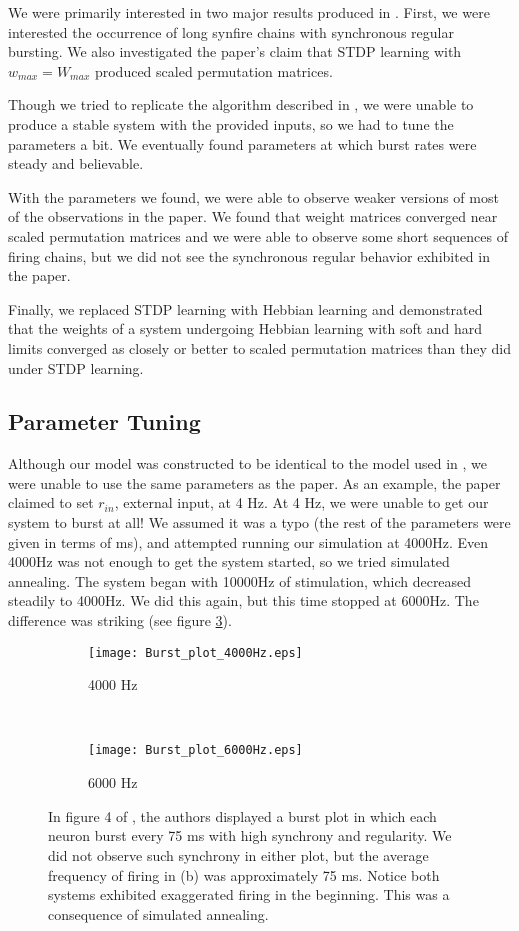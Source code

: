 We were primarily interested in two major results produced in \cite{Fiete}. First, we were interested the occurrence of long synfire chains with synchronous regular bursting. We also investigated the paper's claim that STDP learning with \(w_{max} = W_{max}\) produced scaled permutation matrices.

Though we tried to replicate the algorithm described in \cite{Fiete}, we were unable to produce a stable system with the provided inputs, so we had to tune the parameters a bit. We eventually found parameters at which burst rates were steady and believable. 

With the parameters we found, we were able to observe weaker versions of most of the observations in the paper. We found that weight matrices converged near scaled permutation matrices and we were able to observe some short sequences of firing chains, but we did not see the synchronous regular behavior exhibited in the paper.

Finally, we replaced STDP learning with Hebbian learning and demonstrated that the weights of a system undergoing Hebbian learning with soft and hard limits converged as closely or better to scaled permutation matrices than they did under STDP learning.

\subsection{Parameter Tuning}

Although our model was constructed to be identical to the model used in \cite{Fiete}, we were unable to use the same parameters as the paper. As an example, the paper claimed to set \(r_{in}\), external input, at 4 Hz. At 4 Hz, we were unable to get our system to burst at all! We assumed it was a typo (the rest of the parameters were given in terms of ms), and attempted running our simulation at 4000Hz. Even 4000Hz was not enough to get the system started, so we tried simulated annealing. The system began with 10000Hz of stimulation, which decreased steadily to 4000Hz. We did this again, but this time stopped at 6000Hz. The difference was striking (see figure \ref{burstSTDP}). 

\begin{figure}[H]
\centering
\begin{subfigure}[b]{0.49\textwidth}
\texttt{[image: Burst\_plot\_4000Hz.eps]}
\caption{4000 Hz}
\label{burstSTDP:4000}
\end{subfigure}
\,
\begin{subfigure}[b]{0.49\textwidth}
\texttt{[image: Burst\_plot\_6000Hz.eps]}
\caption{6000 Hz}
\label{burstSTDP:6000}
\end{subfigure}
\caption{In figure 4 of \cite{Fiete}, the authors displayed a burst plot in which each neuron burst every 75 ms with high synchrony and regularity. We did not observe such synchrony in either plot, but the average frequency of firing in (b) was approximately 75 ms. Notice both systems exhibited exaggerated firing in the beginning. This was a consequence of simulated annealing.}
\label{burstSTDP}
\end{figure}

